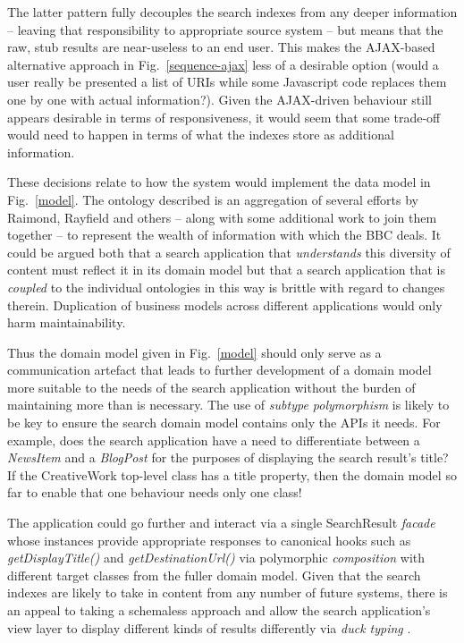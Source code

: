 \documentclass{llncs}
\begin{document}
The latter pattern fully decouples the search indexes from any
deeper information -- leaving that responsibility to appropriate
source system -- but means that the raw, stub results are near-useless
to an end user. This makes the AJAX-based alternative approach
in Fig.~\ref{sequence-ajax}
less of a desirable option (would a user really be presented a list
of URIs while some Javascript code replaces them one by one with
actual information?). Given the AJAX-driven behaviour still appears
desirable in terms of responsiveness, it would seem that some trade-off
would need to happen in terms of what the indexes store as additional
information.

These decisions relate to how the system would implement the data model
in Fig.~\ref{model}. The ontology described is an aggregation
of several efforts by Raimond\cite{raimond2009bbc}, Rayfield
\cite{rayfield2011bbc} and others -- along with some additional work
to join them together -- to represent the wealth of
information with which the BBC deals. It could be argued both that
a search application that \emph{understands} this diversity of
content must reflect it in its domain model but that a search
application that is \emph{coupled} to the individual ontologies
in this way is brittle with regard to changes therein. Duplication
of business models across different applications would only
harm maintainability.

Thus the domain model given in Fig.~\ref{model} should only serve
as a communication artefact that leads to further development of
a domain model more suitable to the needs of the search application
without the burden of maintaining more than is necessary. The use
of \emph{subtype polymorphism}\cite{booch2007object} is likely
to be key to ensure the search domain model contains only the APIs
it needs. For example, does the search application have a need
to differentiate between a \emph{NewsItem} and a \emph{BlogPost}
for the purposes of displaying the search result's title? If the
CreativeWork top-level class has a title property, then the domain
model so far to enable that one behaviour needs only one class!

The application could go further and interact via a single
SearchResult \emph{facade}\cite{fowler2002patterns} whose
instances provide appropriate responses to canonical hooks
such as \emph{getDisplayTitle()} and \emph{getDestinationUrl()}
via polymorphic \emph{composition} with different target classes
from the fuller domain model. Given that the search indexes
are likely to take in content from any number of future systems,
there is an appeal to taking a schemaless approach\cite{sadalage2012nosql}
and allow the search application's view layer to display
different kinds of results differently via \emph{duck typing}
\cite{python2013ducktyping}.
\end{document}
